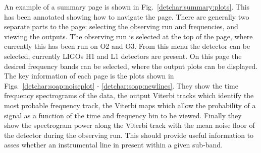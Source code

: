 An example of a summary page is shown in Fig.~\ref{detchar:summary:plots}. This
has been annotated showing how to navigate the page.  There are generally two
separate parts to the page: selecting the observing run and frequencies, and
viewing the outputs.  The observing run is selected at the top of the page,
where currently this has been run on O2 and O3.  From this menu the
detector can be selected, currently \glspl{LIGO} H1 and L1 detectors are
present. On this page the desired frequency bands can be selected, where the output plots can be displayed. 
The key information of each page is the plots shown in
Figs.~\ref{detchar:soap:noiseplot} - \ref{detchar:soap:newlines}.
They show the time frequency spectrograms of the data, the output Viterbi tracks which
identify the most probable frequency track, the Viterbi maps which allow the
probability of a signal as a function of the time and frequency bin to be
viewed.  Finally they show the spectrogram power along the Viterbi track with
the mean noise floor of the detector during the observing run.  This should
provide useful information to asses whether an instrumental line in
present within a given sub-band.

